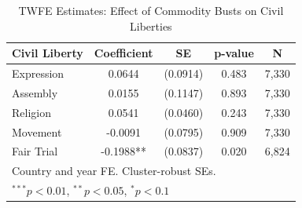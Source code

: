 \begin{table}[htbp]
\centering
\caption{TWFE Estimates: Effect of Commodity Busts on Civil Liberties}
\label{tab:main}
\begin{tabular}{lcccc}
\toprule
Civil Liberty & Coefficient & SE & p-value & N \\
\midrule
  Expression & 0.0644 & (0.0914) & 0.483 & 7,330 \\
  Assembly & 0.0155 & (0.1147) & 0.893 & 7,330 \\
  Religion & 0.0541 & (0.0460) & 0.243 & 7,330 \\
  Movement & -0.0091 & (0.0795) & 0.909 & 7,330 \\
  Fair Trial & -0.1988** & (0.0837) & 0.020 & 6,824 \\
\midrule
\multicolumn{5}{l}{\footnotesize Country and year FE. Cluster-robust SEs.} \\
\multicolumn{5}{l}{\footnotesize $^{***}p<0.01$, $^{**}p<0.05$, $^{*}p<0.1$} \\
\bottomrule
\end{tabular}
\end{table}